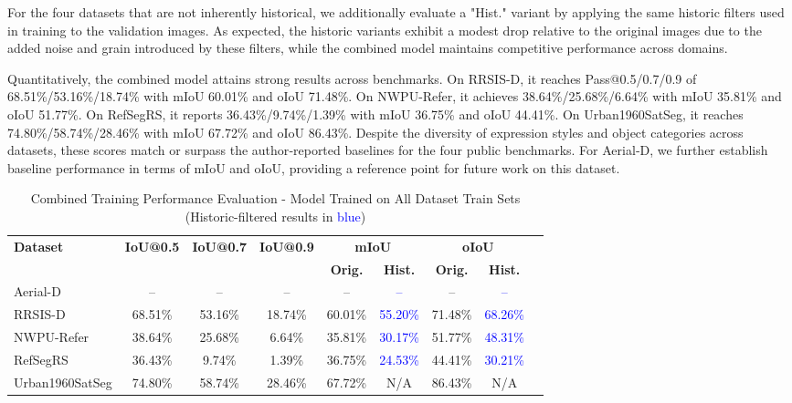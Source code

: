 For the four datasets that are not inherently historical, we additionally evaluate a "Hist." variant by applying the same historic filters used in training to the validation images. As expected, the historic variants exhibit a modest drop relative to the original images due to the added noise and grain introduced by these filters, while the combined model maintains competitive performance across domains.

Quantitatively, the combined model attains strong results across benchmarks. On RRSIS-D, it reaches Pass@0.5/0.7/0.9 of 68.51\%/53.16\%/18.74\% with mIoU 60.01\% and oIoU 71.48\%. On NWPU-Refer, it achieves 38.64\%/25.68\%/6.64\% with mIoU 35.81\% and oIoU 51.77\%. On RefSegRS, it reports 36.43\%/9.74\%/1.39\% with mIoU 36.75\% and oIoU 44.41\%. On Urban1960SatSeg, it reaches 74.80\%/58.74\%/28.46\% with mIoU 67.72\% and oIoU 86.43\%. Despite the diversity of expression styles and object categories across datasets, these scores match or surpass the author‑reported baselines for the four public benchmarks. For Aerial‑D, we further establish baseline performance in terms of mIoU and oIoU, providing a reference point for future work on this dataset.

\begin{table}[t]
\centering
\caption{Combined Training Performance Evaluation - Model Trained on All Dataset Train Sets (Historic-filtered results in \textcolor{blue}{blue})}
\label{tab:combined_training_results}
\begin{tabular}{@{}lcccccccc@{}}
\toprule
\textbf{Dataset} & \textbf{IoU@0.5} & \textbf{IoU@0.7} & \textbf{IoU@0.9} & \multicolumn{2}{c}{\textbf{mIoU}} & \multicolumn{2}{c}{\textbf{oIoU}} \\
\cmidrule(lr){5-6} \cmidrule(lr){7-8}
 & & & & \textbf{Orig.} & \textbf{Hist.} & \textbf{Orig.} & \textbf{Hist.} \\
\midrule
Aerial-D & -- & -- & -- & -- & \textcolor{blue}{--} & -- & \textcolor{blue}{--} \\
RRSIS-D & 68.51\% & 53.16\% & 18.74\% & 60.01\% & \textcolor{blue}{55.20\%} & 71.48\% & \textcolor{blue}{68.26\%} \\
NWPU-Refer & 38.64\% & 25.68\% & 6.64\% & 35.81\% & \textcolor{blue}{30.17\%} & 51.77\% & \textcolor{blue}{48.31\%} \\
RefSegRS & 36.43\% & 9.74\% & 1.39\% & 36.75\% & \textcolor{blue}{24.53\%} & 44.41\% & \textcolor{blue}{30.21\%} \\
Urban1960SatSeg & 74.80\% & 58.74\% & 28.46\% & 67.72\% & N/A & 86.43\% & N/A \\
\bottomrule
\end{tabular}
\end{table}



